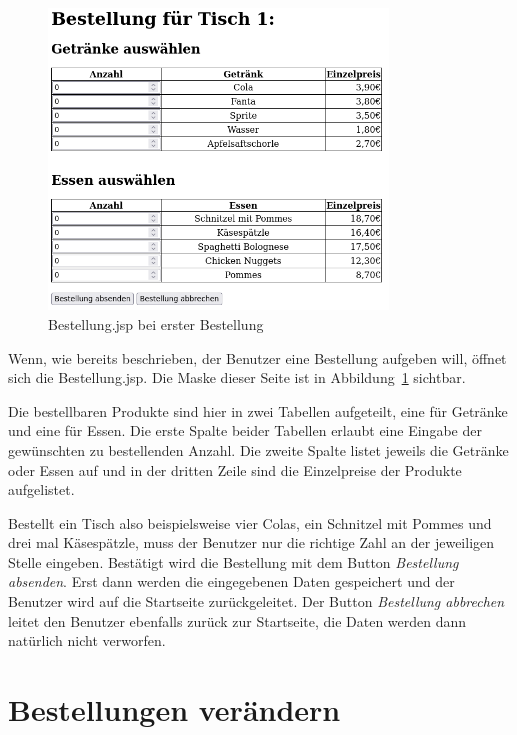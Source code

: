 \begin{figure}[htb]
  \centering
  \includegraphics[height=8cm]{images/InitialBestellungJSP.png}
  \caption[Bestellung.jsp bei erster Bestellung]{Bestellung.jsp bei erster Bestellung}
  \label{abb:InitialBestellungJSP}
\end{figure}

Wenn, wie bereits beschrieben, der Benutzer eine Bestellung aufgeben will, öffnet sich die Bestellung.jsp.
Die Maske dieser Seite ist in Abbildung~\ref{abb:InitialBestellungJSP} sichtbar.

Die bestellbaren Produkte sind hier in zwei Tabellen aufgeteilt, eine für Getränke und eine für Essen.
Die erste Spalte beider Tabellen erlaubt eine Eingabe der gewünschten zu bestellenden Anzahl.
Die zweite Spalte listet jeweils die Getränke oder Essen auf und in der dritten Zeile sind die Einzelpreise der Produkte aufgelistet.

Bestellt ein Tisch also beispielsweise vier Colas, ein Schnitzel mit Pommes und drei mal Käsespätzle, muss der Benutzer nur die richtige Zahl an der jeweiligen Stelle eingeben.
Bestätigt wird die Bestellung mit dem Button \textit{Bestellung absenden}.
Erst dann werden die eingegebenen Daten gespeichert und der Benutzer wird auf die Startseite zurückgeleitet.
Der Button \textit{Bestellung abbrechen} leitet den Benutzer ebenfalls zurück zur Startseite, die Daten werden dann natürlich nicht verworfen.


\section{Bestellungen verändern} %
\label{sec:Bestellungen verändern}

